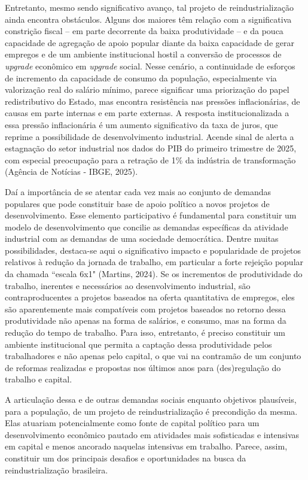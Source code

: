 Entretanto, mesmo sendo significativo avanço, tal projeto de
reindustrialização ainda encontra obstáculos. Alguns dos maiores têm
relação com a significativa constrição fiscal -- em parte decorrente da
baixa produtividade -- e da pouca capacidade de agregação de apoio
popular diante da baixa capacidade de gerar empregos e de um ambiente
institucional hostil a conversão de processos de \emph{upgrade}
econômico em \emph{upgrade} social. Nesse cenário, a continuidade de
esforços de incremento da capacidade de consumo da população,
especialmente via valorização real do salário mínimo, parece significar
uma priorização do papel redistributivo do Estado, mas encontra
resistência nas pressões inflacionárias, de causas em parte internas e
em parte externas. A resposta institucionalizada a essa pressão
inflacionária é um aumento significativo da taxa de juros, que reprime a
possibilidade de desenvolvimento industrial. Acende sinal de alerta a
estagnação do setor industrial nos dados do PIB do primeiro trimestre de
2025, com especial preocupação para a retração de 1\% da indústria de
transformação (Agência de Notícias - IBGE, 2025).

Daí a importância de se atentar cada vez mais ao conjunto de demandas
populares que pode constituir base de apoio político a novos projetos de
desenvolvimento. Esse elemento participativo é fundamental para
constituir um modelo de desenvolvimento que concilie as demandas
específicas da atividade industrial com as demandas de uma sociedade
democrática. Dentre muitas possibilidades, destaca-se aqui o
significativo impacto e popularidade de projetos relativos à redução da
jornada de trabalho, em particular a forte rejeição popular da chamada
``escala 6x1" (Martins, 2024). Se os incrementos de produtividade do
trabalho, inerentes e necessários ao desenvolvimento industrial, são
contraproducentes a projetos baseados na oferta quantitativa de
empregos, eles são aparentemente mais compatíveis com projetos baseados
no retorno dessa produtividade não apenas na forma de salários, e
consumo, mas na forma da redução do tempo de trabalho. Para isso,
entretanto, é preciso constituir um ambiente institucional que permita a
captação dessa produtividade pelos trabalhadores e não apenas pelo
capital, o que vai na contramão de um conjunto de reformas realizadas e
propostas nos últimos anos para (des)regulação do trabalho e capital.

A articulação dessa e de outras demandas sociais enquanto objetivos
plausíveis, para a população, de um projeto de reindustrialização é
precondição da mesma. Elas atuariam potencialmente como fonte de capital
político para um desenvolvimento econômico pautado em atividades mais
sofisticadas e intensivas em capital e menos ancorado naquelas
intensivas em trabalho. Parece, assim, constituir um dos principais
desafios e oportunidades na busca da reindustrialização brasileira.

